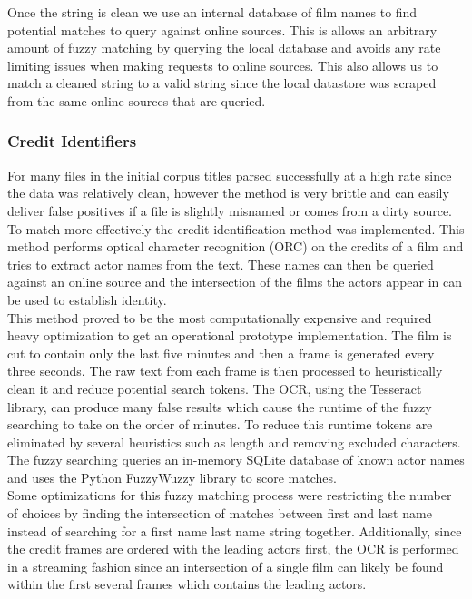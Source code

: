 \documentclass[paper=a4, fontsize=11pt]{scrartcl} %
\numberwithin{equation}{section} %
\numberwithin{figure}{section} %
\numberwithin{table}{section} %
\begin{document}
Once the string is clean we use an internal database of film names to find potential matches to query against online sources. This is allows an arbitrary amount of fuzzy matching by querying the local database and avoids any rate limiting issues when making requests to online sources. This also allows us to match a cleaned string to a valid string since the local datastore was scraped from the same online sources that are queried. \\


\subsubsection{Credit Identifiers}
\label{sec:credit-identifier}

For many files in the initial corpus titles parsed successfully at a high rate since the data was relatively clean, however the method is very brittle and can easily deliver false positives if a file is slightly misnamed or comes from a dirty source. To match more effectively the credit identification method was implemented. This method performs optical character recognition (ORC) on the credits of a film and tries to extract actor names from the text. These names can then be queried against an online source and the intersection of the films the actors appear in can be used to establish identity. \\

This method proved to be the most computationally expensive and required heavy optimization to get an operational prototype implementation. The film is cut to contain only the last five minutes and then a frame is generated every three seconds. The raw text from each frame is then processed to heuristically clean it and reduce potential search tokens. The OCR, using the Tesseract library, can produce many false results which cause the runtime of the fuzzy searching to take on the order of minutes. To reduce this runtime tokens are eliminated by several heuristics such as length and removing excluded characters. The fuzzy searching queries an in-memory SQLite database of known actor names and uses the Python FuzzyWuzzy library to score matches. \\

Some optimizations for this fuzzy matching process were restricting the number of choices by finding the intersection of matches between first and last name instead of searching for a first name last name string together. Additionally, since the credit frames are ordered with the leading actors first, the OCR is performed in a streaming fashion since an intersection of a single film can likely be found within the first several frames which contains the leading actors. \\
\end{document}
